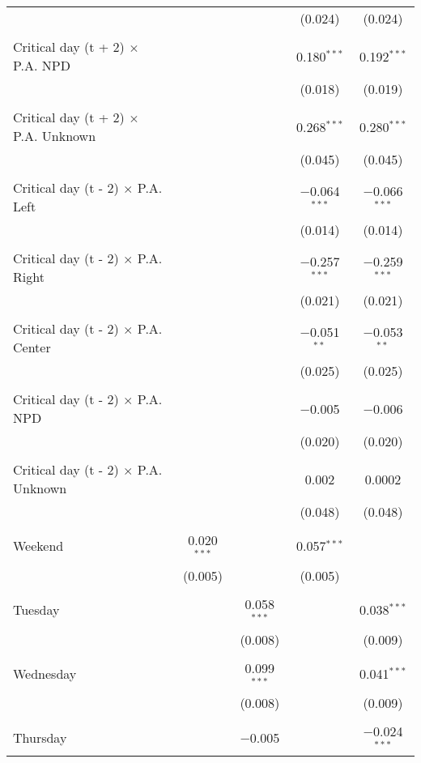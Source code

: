\documentclass[
]{article}
\begin{document}
\begin{table}[!htbp]
{\begin{tabular}{@{\extracolsep{5pt}}lcccc}
  &  &  & (0.024) & (0.024) \\ 
  & & & & \\ 
 Critical day (t + 2) $\times$ P.A. NPD &  &  & 0.180$^{***}$ & 0.192$^{***}$ \\ 
  &  &  & (0.018) & (0.019) \\ 
  & & & & \\ 
 Critical day (t + 2) $\times$ P.A. Unknown &  &  & 0.268$^{***}$ & 0.280$^{***}$ \\ 
  &  &  & (0.045) & (0.045) \\ 
  & & & & \\ 
 Critical day (t - 2) $\times$ P.A. Left &  &  & $-$0.064$^{***}$ & $-$0.066$^{***}$ \\ 
  &  &  & (0.014) & (0.014) \\ 
  & & & & \\ 
 Critical day (t - 2) $\times$ P.A. Right &  &  & $-$0.257$^{***}$ & $-$0.259$^{***}$ \\ 
  &  &  & (0.021) & (0.021) \\ 
  & & & & \\ 
 Critical day (t - 2) $\times$ P.A. Center &  &  & $-$0.051$^{**}$ & $-$0.053$^{**}$ \\ 
  &  &  & (0.025) & (0.025) \\ 
  & & & & \\ 
 Critical day (t - 2) $\times$ P.A. NPD &  &  & $-$0.005 & $-$0.006 \\ 
  &  &  & (0.020) & (0.020) \\ 
  & & & & \\ 
 Critical day (t - 2) $\times$ P.A. Unknown &  &  & 0.002 & 0.0002 \\ 
  &  &  & (0.048) & (0.048) \\ 
  & & & & \\ 
 Weekend & 0.020$^{***}$ &  & 0.057$^{***}$ &  \\ 
  & (0.005) &  & (0.005) &  \\ 
  & & & & \\ 
 Tuesday &  & 0.058$^{***}$ &  & 0.038$^{***}$ \\ 
  &  & (0.008) &  & (0.009) \\ 
  & & & & \\ 
 Wednesday &  & 0.099$^{***}$ &  & 0.041$^{***}$ \\ 
  &  & (0.008) &  & (0.009) \\ 
  & & & & \\ 
 Thursday &  & $-$0.005 &  & $-$0.024$^{***}$ \\ 

\end{tabular}}
\end{table}
\end{document}
